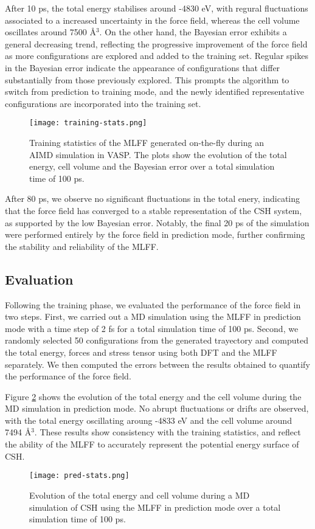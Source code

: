 After 10 ps, the total energy stabilises around -4830 eV, with regural fluctuations associated to a increased uncertainty in the force field, whereas the cell volume oscillates around 7500 \AA$^3$. On the other hand, the Bayesian error exhibits a general decreasing trend, reflecting the progressive improvement of the force field as more configurations are explored and added to the training set. Regular spikes in the Bayesian error indicate the appearance of configurations that differ substantially from those previously explored. This prompts the algorithm to switch from prediction to training mode, and the newly identified representative configurations are incorporated into the training set. 
\begin{figure}[H]
    \centering
    \texttt{[image: training-stats.png]}
    \caption{
    Training statistics of the MLFF generated on-the-fly during an AIMD simulation in VASP. The plots show the evolution of the total energy, cell volume and the Bayesian error over a total simulation time of 100 ps. 
    }
    \label{training-stats}
\end{figure}

After 80 ps, we observe no significant fluctuations in the total enery, indicating that the force field has converged to a stable representation of the CSH system, as supported by the low Bayesian error. Notably, the final 20 ps of the simulation were performed entirely by the force field in prediction mode, further confirming the stability and reliability of the MLFF.

\subsection{Evaluation}
Following the training phase, we evaluated the performance of the force field in two steps. First, we carried out a MD simulation using the MLFF in prediction mode with a time step of 2 fs for a total simulation time of 100 ps. Second, we randomly selected 50 configurations from the generated trayectory and computed the total energy, forces and stress tensor using both DFT and the MLFF separately. We then computed the errors between the results obtained to quantify the performance of the force field. 

Figure \ref{pred-stats} shows the evolution of the total energy and the cell volume during the MD simulation in prediction mode. No abrupt fluctuations or drifts are observed, with the total energy oscillating aroung -4833 eV and the cell volume around 7494 \AA$^3$. These results show consistency with the training statistics, and reflect the ability of the MLFF to accurately represent the potential energy surface of CSH. 
\begin{figure}[h!]
    \centering
    \texttt{[image: pred-stats.png]}
    \caption{
    Evolution of the total energy and cell volume during a MD simulation of CSH using the MLFF in prediction mode over a total simulation time of 100 ps.  
    }
    \label{pred-stats}
\end{figure}


